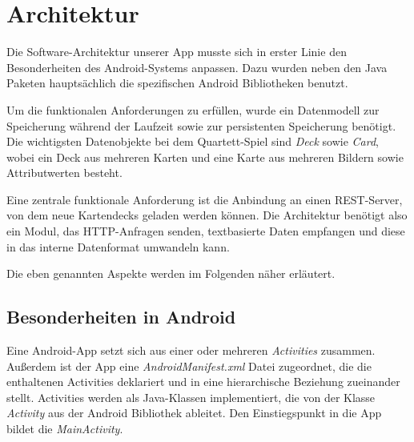 \chapter{Architektur}
\label{cha:architektur}

Die Software-Architektur unserer App musste sich in erster Linie den Besonderheiten des Android-Systems anpassen. Dazu wurden neben den Java Paketen hauptsächlich die spezifischen Android Bibliotheken benutzt.

Um die funktionalen Anforderungen zu erfüllen, wurde ein Datenmodell zur Speicherung während der Laufzeit sowie zur persistenten Speicherung benötigt. Die wichtigsten Datenobjekte bei dem Quartett-Spiel sind \emph{Deck} sowie \emph{Card}, wobei ein Deck aus mehreren Karten und eine Karte aus mehreren Bildern sowie Attributwerten besteht.

Eine zentrale funktionale Anforderung ist die Anbindung an einen REST-Server, von dem neue Kartendecks geladen werden können. Die Architektur benötigt also ein Modul, das HTTP-Anfragen senden, textbasierte Daten empfangen und diese in das interne Datenformat umwandeln kann.

Die eben genannten Aspekte werden im Folgenden näher erläutert.

\section{Besonderheiten in Android}
\label{sec:besonderheiten_android}

Eine Android-App setzt sich aus einer oder mehreren \emph{Activities} zusammen. Außerdem ist der App eine \emph{AndroidManifest.xml} Datei zugeordnet, die die enthaltenen Activities deklariert und in eine hierarchische Beziehung zueinander stellt. Activities werden als Java-Klassen implementiert, die von der Klasse \emph{Activity} aus der Android Bibliothek ableitet. Den Einstiegspunkt in die App bildet die \emph{MainActivity}.

